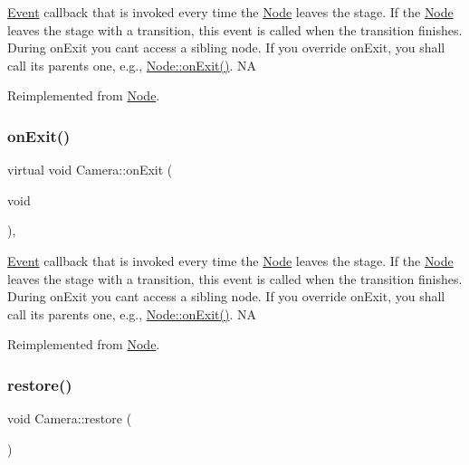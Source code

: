 \hyperlink{classEvent}{Event} callback that is invoked every time the \hyperlink{classNode}{Node} leaves the \textquotesingle{}stage\textquotesingle{}. If the \hyperlink{classNode}{Node} leaves the \textquotesingle{}stage\textquotesingle{} with a transition, this event is called when the transition finishes. During on\+Exit you can\textquotesingle{}t access a sibling node. If you override on\+Exit, you shall call its parent\textquotesingle{}s one, e.\+g., \hyperlink{classNode_ac83de835ea315e3179d4293acd8903ac}{Node\+::on\+Exit()}.  NA 

Reimplemented from \hyperlink{classNode_ac83de835ea315e3179d4293acd8903ac}{Node}.

\mbox{\label{classCamera_aff2efb18d2837f4c443666ae94993185}} 
\subsubsection{\texorpdfstring{on\+Exit()}{onExit()}\hspace{0.1cm}{\footnotesize\ttfamily [2/2]}}
{\footnotesize\ttfamily virtual void Camera\+::on\+Exit (\begin{DoxyParamCaption}\item[{void}]{ }\end{DoxyParamCaption})\hspace{0.3cm}{\ttfamily [override]}, {\ttfamily [virtual]}}

\hyperlink{classEvent}{Event} callback that is invoked every time the \hyperlink{classNode}{Node} leaves the \textquotesingle{}stage\textquotesingle{}. If the \hyperlink{classNode}{Node} leaves the \textquotesingle{}stage\textquotesingle{} with a transition, this event is called when the transition finishes. During on\+Exit you can\textquotesingle{}t access a sibling node. If you override on\+Exit, you shall call its parent\textquotesingle{}s one, e.\+g., \hyperlink{classNode_ac83de835ea315e3179d4293acd8903ac}{Node\+::on\+Exit()}.  NA 

Reimplemented from \hyperlink{classNode_ac83de835ea315e3179d4293acd8903ac}{Node}.

\mbox{\label{classCamera_a5e2265707fe1a6e67e06a2f7d2893b74}} 
\subsubsection{\texorpdfstring{restore()}{restore()}\hspace{0.1cm}{\footnotesize\ttfamily [1/2]}}
{\footnotesize\ttfamily void Camera\+::restore (\begin{DoxyParamCaption}{ }\end{DoxyParamCaption})}

